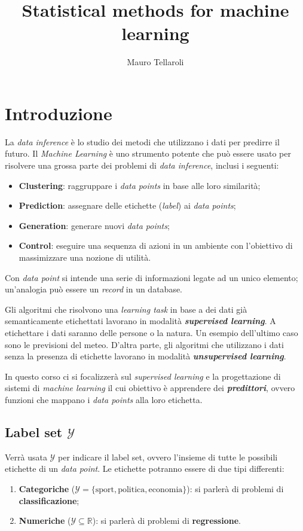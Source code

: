 \documentclass[a4paper]{article}
\newcommand{\Y}{\ensuremath{\mathcal{Y}}}
\begin{document}
\title{Statistical methods for machine learning}
\author{Mauro Tellaroli}
\date{}
\maketitle

\section{Introduzione}

La \textit{data inference} è lo studio dei metodi che utilizzano i dati per predirre il futuro. 
Il \textit{Machine Learning} è uno strumento potente che può essere usato per risolvere una 
grossa parte dei problemi di \textit{data inference}, inclusi i seguenti:
\begin{itemize}
    \item \textbf{Clustering}: raggruppare i \textit{data points} in base alle loro similarità;
    \item \textbf{Prediction}: assegnare delle etichette (\textit{label}) ai \textit{data points};
    \item \textbf{Generation}: generare nuovi \textit{data points};
    \item    \textbf{Control}: eseguire una sequenza di azioni in un ambiente con l'obiettivo di
                               massimizzare una nozione di utilità.
\end{itemize}

Con \textit{data point} si intende una serie di informazioni legate ad un unico elemento;
un'analogia può essere un \textit{record} in un database.

Gli algoritmi che risolvono una \textit{learning task} in base a dei dati già semanticamente
etichettati lavorano in modalità \textbf{\textit{supervised learning}}. A etichettare i dati
saranno delle persone o la natura. Un esempio dell'ultimo caso sono le previsioni del meteo. 
D'altra parte, gli algoritmi che utilizzano i dati senza la presenza di etichette lavorano in
modalità \textbf{\textit{unsupervised learning}}.

In questo corso ci si focalizzerà sul \textit{supervised learning} e la progettazione di 
sistemi di \textit{machine learning} il cui obiettivo è apprendere dei 
\textbf{\textit{predittori}}, ovvero funzioni che mappano i \textit{data points} alla loro
etichetta.

\subsection*{Label set $\Y$}
Verrà usata $\Y$ per indicare il label set, ovvero l'insieme di tutte le possibili
etichette di un \textit{data point}. Le etichette potranno essere di due tipi differenti:
\begin{enumerate}
    \item \textbf{Categoriche} ($\Y = \{ \text{sport},\text{politica},\text{economia}\}$):
        si parlerà di problemi di \textbf{classificazione};
    \item \textbf{Numeriche} ($\Y \subseteq \mathbb{R} $): 
        si parlerà di problemi di \textbf{regressione}.
\end{enumerate}
\end{document}
